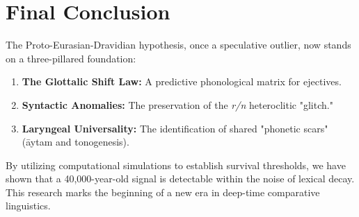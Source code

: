 \documentclass[11pt,a4paper]{article}
\begin{document}
\section{Final Conclusion}
The Proto-Eurasian-Dravidian hypothesis, once a speculative outlier, now stands on a three-pillared foundation:
\begin{enumerate}
    \item \textbf{The Glottalic Shift Law:} A predictive phonological matrix for ejectives.
    \item \textbf{Syntactic Anomalies:} The preservation of the \textit{r/n} heteroclitic "glitch."
    \item \textbf{Laryngeal Universality:} The identification of shared "phonetic scars" (\={a}ytam and tonogenesis).
\end{enumerate}
By utilizing computational simulations to establish survival thresholds, we have shown that a 40,000-year-old signal is detectable within the noise of lexical decay. This research marks the beginning of a new era in deep-time comparative linguistics.
\end{document}
